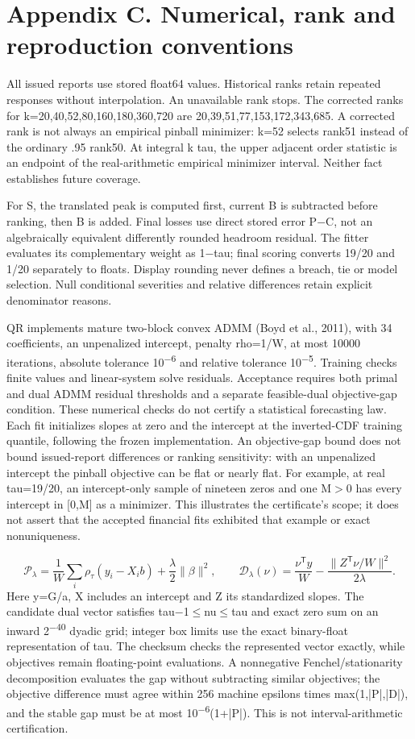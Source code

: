 \documentclass[10pt,a4paper]{article}
\begin{document}
\section*{Appendix C. Numerical, rank and reproduction conventions}
All issued reports use stored float64 values. Historical ranks retain repeated responses without interpolation. An unavailable rank stops. The corrected ranks for k=20,40,52,80,160,180,360,720 are 20,39,51,77,153,172,343,685. A corrected rank is not always an empirical pinball minimizer: k=52 selects rank51 instead of the ordinary .95 rank50. At integral k tau, the upper adjacent order statistic is an endpoint of the real-arithmetic empirical minimizer interval. Neither fact establishes future coverage.

For S, the translated peak is computed first, current B is subtracted before ranking, then B is added. Final losses use direct stored error P\(-\)C, not an algebraically equivalent differently rounded headroom residual. The fitter evaluates its complementary weight as 1\(-\)tau; final scoring converts 19/20 and 1/20 separately to floats. Display rounding never defines a breach, tie or model selection. Null conditional severities and relative differences retain explicit denominator reasons.

QR implements mature two-block convex ADMM (Boyd et al., 2011), with 34 coefficients, an unpenalized intercept, penalty rho=1/W, at most 10000 iterations, absolute tolerance 10\textsuperscript{\(-\)6} and relative tolerance 10\textsuperscript{\(-\)5}. Training checks finite values and linear-system solve residuals. Acceptance requires both primal and dual ADMM residual thresholds and a separate feasible-dual objective-gap condition. These numerical checks do not certify a statistical forecasting law. Each fit initializes slopes at zero and the intercept at the inverted-CDF training quantile, following the frozen implementation. An objective-gap bound does not bound issued-report differences or ranking sensitivity: with an unpenalized intercept the pinball objective can be flat or nearly flat. For example, at real tau=19/20, an intercept-only sample of nineteen zeros and one M\( > \)0 has every intercept in [0,M] as a minimizer. This illustrates the certificate's scope; it does not assert that the accepted financial fits exhibited that example or exact nonuniqueness.

\[
\mathcal P_\lambda=\frac1W\sum_i\rho_\tau(y_i-X_i b)+\frac\lambda2\|\beta\|^2,\qquad\mathcal D_\lambda(\nu)=\frac{\nu^{\mathsf T}y}{W}-\frac{\|Z^{\mathsf T}\nu/W\|^2}{2\lambda}.
\]
Here y=G/a, X includes an intercept and Z its standardized slopes. The candidate dual vector satisfies tau\(-\)1\(\le\)nu\(\le\)tau and exact zero sum on an inward 2\textsuperscript{\(-\)40} dyadic grid; integer box limits use the exact binary-float representation of tau. The checksum checks the represented vector exactly, while objectives remain floating-point evaluations. A nonnegative Fenchel/stationarity decomposition evaluates the gap without subtracting similar objectives; the objective difference must agree within 256 machine epsilons times max(1,|P|,|D|), and the stable gap must be at most 10\textsuperscript{\(-\)6}(1+|P|). This is not interval-arithmetic certification.
\end{document}

